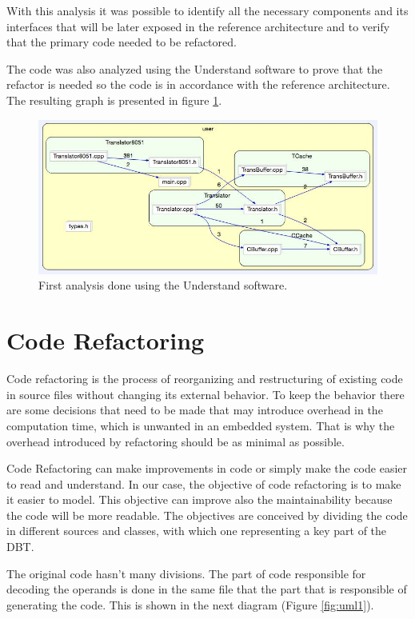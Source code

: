 \documentclass[11pt]{report}
\begin{document}
	\par With this analysis it was possible to identify all the necessary components and its interfaces that will be later exposed in the reference architecture and to verify that the primary code needed to be refactored.

	\par The code was also analyzed using the Understand software to prove that the refactor is needed so the code is in accordance with the reference architecture. The resulting graph is presented in figure \ref{fig:understand1}.
	
	\begin{figure} [H]
		\centering
		\includegraphics[width=0.6\linewidth]{Images/refactor1.jpg}
		\caption{First analysis done using the Understand software.}
		\label{fig:understand1}
	\end{figure}

	\section{Code Refactoring}
	Code refactoring is the process of reorganizing and restructuring of existing code in source files without changing its external behavior. To keep the behavior there are some decisions that need to be made that may introduce overhead in the computation time, which is unwanted in an embedded system. That is why the overhead introduced by refactoring should be as minimal as possible.
	
	Code Refactoring can make improvements in code or simply make the code easier to read and understand.
	In our case, the objective of code refactoring is to make it easier to model. This objective can improve also the maintainability because the code will be more readable. The objectives are conceived by dividing the code in different sources and classes, with which one representing a key part of the DBT.
	
	The original code hasn't many divisions. The part of code responsible for decoding the operands is done in the same file that the part that is responsible of generating the code. 
	This is shown in the next diagram (Figure \ref{fig:uml1}).
	
\end{document}
